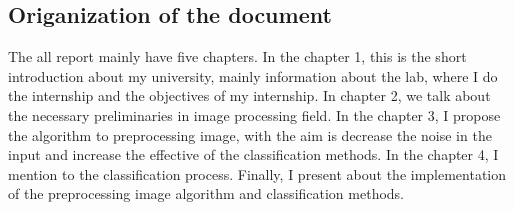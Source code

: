 \subsection{Origanization of the document}
The all report mainly have five chapters. In the chapter 1, this is the short introduction about my university, mainly information about the lab, where I do the internship and the objectives of my internship. In chapter 2, we talk about the necessary preliminaries in image processing field. In the chapter 3, I propose the algorithm to preprocessing image, with the aim is decrease the noise in the input and increase the effective of the classification methods. In the chapter 4, I mention to the classification process. Finally, I present about the implementation of the preprocessing image algorithm and classification methods.































